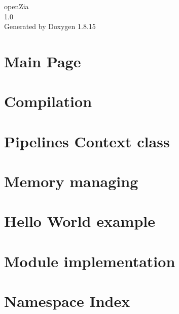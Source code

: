 \let\mypdfximage\pdfximage\def\pdfximage{\immediate\mypdfximage}\documentclass[twoside]{book}
\newcommand{\+}{\discretionary{\mbox{\scriptsize$\hookleftarrow$}}{}{}}
\newcommand{\clearemptydoublepage}{%
  \newpage{\pagestyle{empty}\cleardoublepage}%
}
\begin{document}
\hypersetup{pageanchor=false,
             bookmarksnumbered=true,
             pdfencoding=unicode
            }
\begin{titlepage}
\vspace*{7cm}
\begin{center}%
{\Large open\+Zia \\[1ex]\large 1.\+0 }\\
\vspace*{1cm}
{\large Generated by Doxygen 1.8.15}\\
\end{center}
\end{titlepage}
\clearemptydoublepage
{}
\tableofcontents
\clearemptydoublepage
{}
\hypersetup{pageanchor=true}

\chapter{Main Page}
\label{index}\hypertarget{index}{}
\chapter{Compilation}
\label{md__c_o_m_p_i_l_a_t_i_o_n}

\chapter{Pipeline\textquotesingle{}s Context class}
\label{md__c_o_n_t_e_x_t}

\chapter{Memory managing}
\label{md__g_u_i_d_e_l_i_n_e}

\chapter{Hello World example}
\label{md__h_e_l_l_o}

\chapter{Module implementation}
\label{md__m_o_d_u_l_e}

\chapter{Namespace Index}

\end{document}
